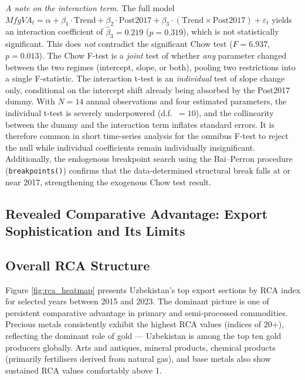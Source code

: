 \documentclass[14pt,a4paper]{extarticle}
\begin{document}
\textit{A note on the interaction term.} The full model $MfgVA_t = \alpha + \beta_1 \cdot \text{Trend} + \beta_2 \cdot \text{Post2017} + \beta_3 \cdot (\text{Trend} \times \text{Post2017}) + \varepsilon_t$ yields an interaction coefficient of $\hat{\beta}_3 = 0.219$ ($p = 0.319$), which is not statistically significant. This does \textit{not} contradict the significant Chow test ($F = 6.937$, $p = 0.013$). The Chow F-test is a \textit{joint} test of whether \textit{any} parameter changed between the two regimes (intercept, slope, or both), pooling two restrictions into a single F-statistic. The interaction t-test is an \textit{individual} test of slope change only, conditional on the intercept shift already being absorbed by the Post2017 dummy. With $N = 14$ annual observations and four estimated parameters, the individual t-test is severely underpowered (d.f.\ $= 10$), and the collinearity between the dummy and the interaction term inflates standard errors. It is therefore common in short time-series analysis for the omnibus F-test to reject the null while individual coefficients remain individually insignificant. Additionally, the endogenous breakpoint search using the Bai--Perron procedure (\texttt{breakpoints()}) confirms that the data-determined structural break falls at or near 2017, strengthening the exogenous Chow test result.


\subsection{Revealed Comparative Advantage: Export Sophistication and Its Limits}

\subsection{Overall RCA Structure}

Figure \ref{fig:rca_heatmap} presents Uzbekistan's top export sections by RCA index for selected years between 2015 and 2023. The dominant picture is one of persistent comparative advantage in primary and semi-processed commodities. Precious metals consistently exhibit the highest RCA values (indices of 20+), reflecting the dominant role of gold --- Uzbekistan is among the top ten gold producers globally. Arts and antiques, mineral products, chemical products (primarily fertilisers derived from natural gas), and base metals also show sustained RCA values comfortably above 1.
\end{document}
